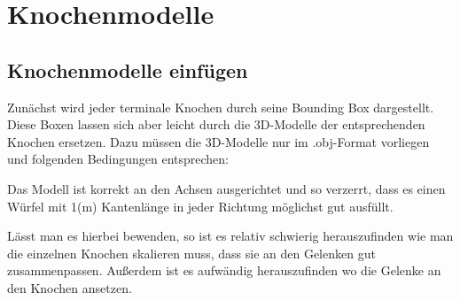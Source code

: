 \chapter{Knochenmodelle}

\section{Knochenmodelle einfügen}

Zunächst wird jeder terminale Knochen durch seine Bounding Box dargestellt.
Diese Boxen lassen sich aber leicht durch die 3D-Modelle der entsprechenden Knochen ersetzen. Dazu müssen die 3D-Modelle nur im .obj-Format vorliegen und folgenden Bedingungen entsprechen:

Das Modell ist korrekt an den Achsen ausgerichtet und so verzerrt, dass es einen Würfel mit 1(m) Kantenlänge in jeder Richtung möglichst gut ausfüllt.

Lässt man es hierbei bewenden, so ist es relativ schwierig herauszufinden wie man die einzelnen Knochen skalieren muss, dass sie an den Gelenken gut zusammenpassen. Außerdem ist es aufwändig herauszufinden wo die Gelenke an den Knochen ansetzen.

